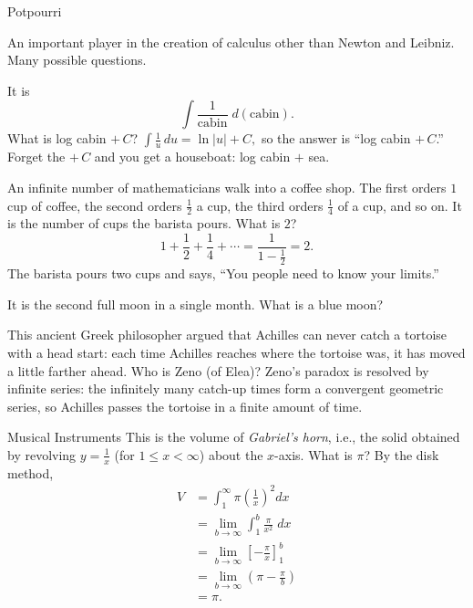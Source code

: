 \documentclass{article}
\begin{document}
\begin{category}{Potpourri}

  \begin{clue}[say]
    An important player in the creation of calculus other than Newton and Leibniz.
  \response
    Many possible questions.
  \end{clue}

  \begin{clue}[say]
    It is
    \[ \int \frac{1}{\text{cabin}} \; d(\text{cabin}). \]
  \response
    What is log cabin $+\,C$?
  \solution
    $\displaystyle\int \frac{1}{u}\,du = \ln|u| + C,$ so the answer is
    ``log cabin $+\,C$.'' Forget the $+\,C$ and you get a houseboat: log
    cabin $+$ sea.
  \end{clue}

  \begin{clue}[say]
    An infinite number of mathematicians walk into a coffee shop. The first
    orders $1$ cup of coffee, the second orders $\frac{1}{2}$ a cup, the third
    orders $\frac{1}{4}$ of a cup, and so on. It is the number of cups the
    barista pours.
  \response
    What is $2$?
  \solution
    \[ 1 + \frac{1}{2} + \frac{1}{4} + \cdots = \frac{1}{1 - \frac{1}{2}} = 2. \]
    The barista pours two cups and says, ``You people need to know
    your limits.''
  \end{clue}

  \begin{clue}[say]
    It is the second full moon in a single month.
  \response
    What is a blue moon?
  \end{clue}

  \begin{clue}[say]
    This ancient Greek philosopher argued that Achilles can never catch a
    tortoise with a head start: each time Achilles reaches where the tortoise
    was, it has moved a little farther ahead.
  \response
    Who is Zeno (of Elea)?
  \solution
    Zeno's paradox is resolved by infinite series: the infinitely many
    catch-up times form a convergent geometric series, so Achilles passes
    the tortoise in a finite amount of time.
  \end{clue}

\end{category}

\begin{final}{Musical Instruments}
  This is the volume of \emph{Gabriel's horn}, i.e., the solid obtained by
  revolving $\displaystyle y=\frac{1}{x}$ (for $1\le x<\infty$) about the
  $x$-axis.
\response
  What is $\pi$?
\solution
  By the disk method,
  \begin{align*}
  V
  &= \int_{1}^{\infty}\pi\left(\frac{1}{x}\right)^{2} dx \\
  &= \lim_{b\to \infty} \int_{1}^{b}\frac{\pi}{x^{2}} \; dx \\
  &= \lim_{b\to \infty}\left[-\frac{\pi}{x}\right]_{1}^{b} \\
  &= \lim_{b\to \infty}\left(\pi-\frac{\pi}{b}\right) \\
  &= \pi.
  \end{align*}
\end{final}
\end{document}
